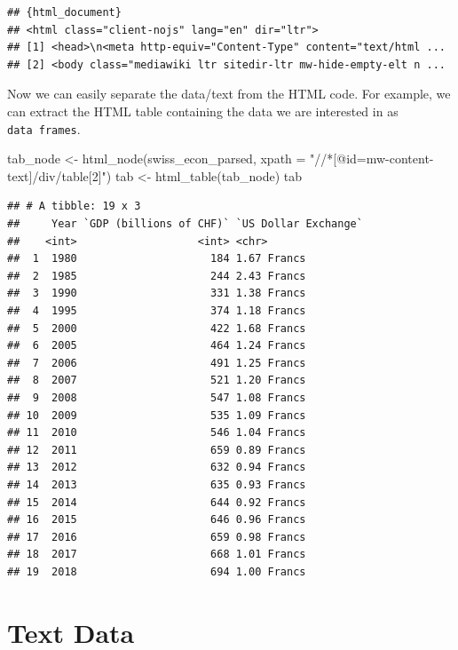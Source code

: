 \documentclass[
  12pt,
]{style/krantz}
\newenvironment{Shaded}{\begin{snugshade}}{\end{snugshade}}
\newcommand{\AttributeTok}[1]{\textcolor[rgb]{0.77,0.63,0.00}{#1}}
\newcommand{\FunctionTok}[1]{\textcolor[rgb]{0.00,0.00,0.00}{#1}}
\newcommand{\NormalTok}[1]{#1}
\newcommand{\OtherTok}[1]{\textcolor[rgb]{0.56,0.35,0.01}{#1}}
\newcommand{\StringTok}[1]{\textcolor[rgb]{0.31,0.60,0.02}{#1}}
\begin{document}
\begin{verbatim}
## {html_document}
## <html class="client-nojs" lang="en" dir="ltr">
## [1] <head>\n<meta http-equiv="Content-Type" content="text/html ...
## [2] <body class="mediawiki ltr sitedir-ltr mw-hide-empty-elt n ...
\end{verbatim}

Now we can easily separate the data/text from the HTML code. For example, we can extract the HTML table containing the data we are interested in as \texttt{data\ frames}.

\begin{Shaded}
\begin{Highlighting}[]
\NormalTok{tab\_node }\OtherTok{\textless{}{-}} \FunctionTok{html\_node}\NormalTok{(swiss\_econ\_parsed, }\AttributeTok{xpath =} \StringTok{"//*[@id=\textquotesingle{}mw{-}content{-}text\textquotesingle{}]/div/table[2]"}\NormalTok{)}
\NormalTok{tab }\OtherTok{\textless{}{-}} \FunctionTok{html\_table}\NormalTok{(tab\_node)}
\NormalTok{tab}
\end{Highlighting}
\end{Shaded}

\begin{verbatim}
## # A tibble: 19 x 3
##     Year `GDP (billions of CHF)` `US Dollar Exchange`
##    <int>                   <int> <chr>               
##  1  1980                     184 1.67 Francs         
##  2  1985                     244 2.43 Francs         
##  3  1990                     331 1.38 Francs         
##  4  1995                     374 1.18 Francs         
##  5  2000                     422 1.68 Francs         
##  6  2005                     464 1.24 Francs         
##  7  2006                     491 1.25 Francs         
##  8  2007                     521 1.20 Francs         
##  9  2008                     547 1.08 Francs         
## 10  2009                     535 1.09 Francs         
## 11  2010                     546 1.04 Francs         
## 12  2011                     659 0.89 Francs         
## 13  2012                     632 0.94 Francs         
## 14  2013                     635 0.93 Francs         
## 15  2014                     644 0.92 Francs         
## 16  2015                     646 0.96 Francs         
## 17  2016                     659 0.98 Francs         
## 18  2017                     668 1.01 Francs         
## 19  2018                     694 1.00 Francs
\end{verbatim}

\hypertarget{text-data}{%
\chapter{Text Data}\label{text-data}}
\end{document}
